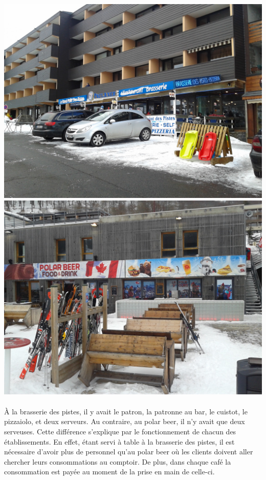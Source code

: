 \begin{center}
\includegraphics[scale=0.15]{brasserieDesPistes.jpg}
\includegraphics[scale=0.15]{PolarBeer.jpg}
\end{center}

\paragraph{}
À la brasserie des pistes, il y avait le patron, la patronne au bar, le
cuistot, le pizzaiolo, et deux serveurs. Au contraire, au polar beer, il n’y
avait que deux serveuses. Cette différence s’explique par le fonctionnement de
chacun des établissements. En effet, étant servi à table à la brasserie des
pistes, il est nécessaire d’avoir plus de personnel qu’au polar beer où les
clients doivent aller chercher leurs consommations au comptoir. De plus, dans
chaque café la consommation est payée au moment de la prise en main de
celle-ci.

